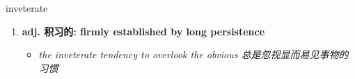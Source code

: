 
\begin{frame}
{\huge inveterate}
\begin{center}
\begin{enumerate}\Large
  \item \textbf{adj. 积习的: firmly established by long persistence}
  \begin{itemize}
    \item \em{\Large{the inveterate tendency to overlook the obvious 总是忽视显而易见事物的习惯}}
  \end{itemize}
\end{enumerate}
\end{center}
\end{frame}
